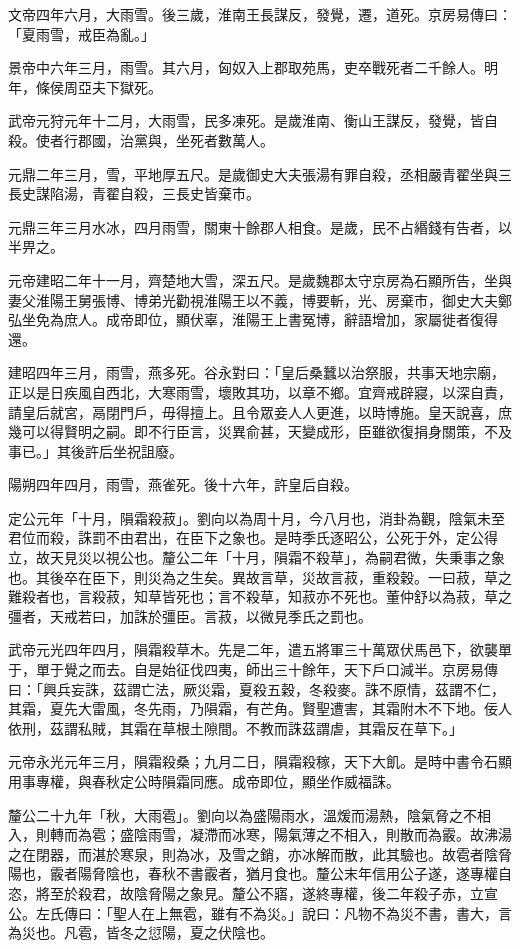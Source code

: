 \begin{pinyinscope}
文帝四年六月，大雨雪。後三歲，淮南王長謀反，發覺，遷，道死。京房易傳曰：「夏雨雪，戒臣為亂。」

景帝中六年三月，雨雪。其六月，匈奴入上郡取苑馬，吏卒戰死者二千餘人。明年，條侯周亞夫下獄死。

武帝元狩元年十二月，大雨雪，民多凍死。是歲淮南、衡山王謀反，發覺，皆自殺。使者行郡國，治黨與，坐死者數萬人。

元鼎二年三月，雪，平地厚五尺。是歲御史大夫張湯有罪自殺，丞相嚴青翟坐與三長史謀陷湯，青翟自殺，三長史皆棄市。

元鼎三年三月水冰，四月雨雪，關東十餘郡人相食。是歲，民不占緡錢有告者，以半畀之。

元帝建昭二年十一月，齊楚地大雪，深五尺。是歲魏郡太守京房為石顯所告，坐與妻父淮陽王舅張博、博弟光勸視淮陽王以不義，博要斬，光、房棄市，御史大夫鄭弘坐免為庶人。成帝即位，顯伏辜，淮陽王上書冤博，辭語增加，家屬徙者復得還。

建昭四年三月，雨雪，燕多死。谷永對曰：「皇后桑蠶以治祭服，共事天地宗廟，正以是日疾風自西北，大寒雨雪，壞敗其功，以章不鄉。宜齊戒辟寢，以深自責，請皇后就宮，鬲閉門戶，毋得擅上。且令眾妾人人更進，以時博施。皇天說喜，庶幾可以得賢明之嗣。即不行臣言，災異俞甚，天變成形，臣雖欲復捐身關策，不及事已。」其後許后坐祝詛廢。

陽朔四年四月，雨雪，燕雀死。後十六年，許皇后自殺。

定公元年「十月，隕霜殺菽」。劉向以為周十月，今八月也，消卦為觀，陰氣未至君位而殺，誅罰不由君出，在臣下之象也。是時季氏逐昭公，公死于外，定公得立，故天見災以視公也。釐公二年「十月，隕霜不殺草」，為嗣君微，失秉事之象也。其後卒在臣下，則災為之生矣。異故言草，災故言菽，重殺穀。一曰菽，草之難殺者也，言殺菽，知草皆死也；言不殺草，知菽亦不死也。董仲舒以為菽，草之彊者，天戒若曰，加誅於彊臣。言菽，以微見季氏之罰也。

武帝元光四年四月，隕霜殺草木。先是二年，遣五將軍三十萬眾伏馬邑下，欲襲單于，單于覺之而去。自是始征伐四夷，師出三十餘年，天下戶口減半。京房易傳曰：「興兵妄誅，茲謂亡法，厥災霜，夏殺五穀，冬殺麥。誅不原情，茲謂不仁，其霜，夏先大雷風，冬先雨，乃隕霜，有芒角。賢聖遭害，其霜附木不下地。佞人依刑，茲謂私賊，其霜在草根土隙間。不教而誅茲謂虐，其霜反在草下。」

元帝永光元年三月，隕霜殺桑；九月二日，隕霜殺稼，天下大飢。是時中書令石顯用事專權，與春秋定公時隕霜同應。成帝即位，顯坐作威福誅。

釐公二十九年「秋，大雨雹」。劉向以為盛陽雨水，溫煖而湯熱，陰氣脅之不相入，則轉而為雹；盛陰雨雪，凝滯而冰寒，陽氣薄之不相入，則散而為霰。故沸湯之在閉器，而湛於寒泉，則為冰，及雪之銷，亦冰解而散，此其驗也。故雹者陰脅陽也，霰者陽脅陰也，春秋不書霰者，猶月食也。釐公末年信用公子遂，遂專權自恣，將至於殺君，故陰脅陽之象見。釐公不寤，遂終專權，後二年殺子赤，立宣公。左氏傳曰：「聖人在上無雹，雖有不為災。」說曰：凡物不為災不書，書大，言為災也。凡雹，皆冬之愆陽，夏之伏陰也。


\end{pinyinscope}
